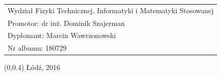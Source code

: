 \documentclass[12pt, oneside, a4paper]{mwbk}
\begin{document}
\begin{titlepage}
\begin{center}
\selectfont
\hspace{-1cm}
\begin{tabular}{l}
Wydział Fizyki Technicznej, Informatyki i Matematyki Stosowanej \\
Promotor: dr inż. Dominik Szajerman \\
Dyplomant: Marcin Wawrzonowski \\
Nr albumu: 180729
\end{tabular}
\end{center}
\vspace{-.5cm}
\begin{center}
\selectfont
\begin{textblock}{13}(0,0.4)
Łódź, 2016
\end{textblock}
\end{center}
\end{titlepage}

\tableofcontents













\lstlistoflistings

\listoffigures

\listoftables

\listofalgorithms
\end{document}
